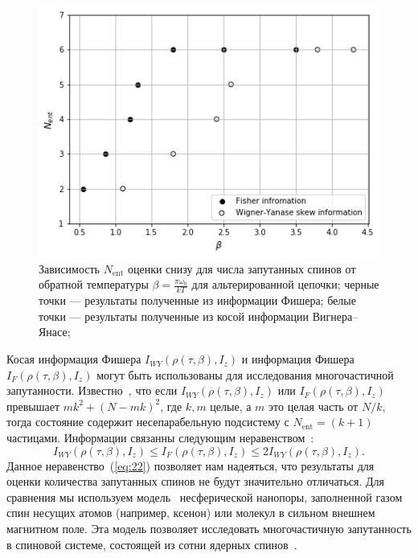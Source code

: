 \documentclass[preprint,12pt]{elsarticle}
\begin{document}
\begin{figure}
	\includegraphics[width=0.95\linewidth]{zigzag_entangled_spins_by_temp}
	\caption{
	    Зависимость $N_\mathrm{ent}$ оценки снизу для числа запутанных спинов от обратной температуры $\beta = \frac{\pi \omega_0}{kT}$ для альтерированной  цепочки;
	    черные точки --- результаты полученные из информации Фишера;
	    белые точки --- результаты полученные из косой информации Вигнера--Янасе;
	}
	\label{fig:3}
\end{figure}

Косая информация Фишера  $I_{WY}(\rho(\tau,\beta),I_z)$ и информация Фишера $I_F(\rho(\tau,\beta),I_z)$
могут быть использованы для исследования многочастичной запутанности. 
Известно~\cite{5,6}, что если
$I_{WY}\left( \rho(\tau, \beta), I_z \right)$
или
$I_{F}\left( \rho(\tau, \beta), I_z \right)$
превышает $mk^2 + (N - mk)^2$,
где $k, m$ целые, а $m$ это целая часть от $N/k$,
тогда состояние содержит несепарабельную подсистему с $N_\mathrm{ent} = (k + 1) $ частицами. 
Информации связанны следующим неравенством~\cite{3}:
%
\begin{equation} \label{eq:22}
    I_{WY}\left(\rho(\tau,\beta), I_z\right)
    \leq I_F\left(\rho(\tau,\beta), I_z\right)
    \leq 2I_{WY}\left(\rho(\tau,\beta), I_z\right).
\end{equation}
%
Данное неравенство~(\ref{eq:22}) позволяет нам надеяться, что результаты для оценки количества запутанных спинов не будут значительно отличаться. 
Для сравнения мы используем модель~\cite{23} несферической нанопоры, заполненной газом спин несущих атомов (например, ксенон) или молекул в сильном внешнем магнитном поле. 
Эта модель позволяет исследовать многочастичную запутанность в спиновой системе, состоящей из сотни ядерных спинов~\cite{8}. 
\end{document}
